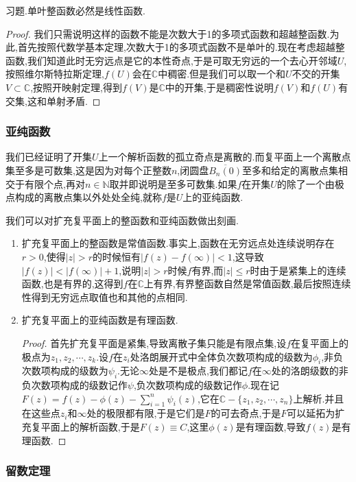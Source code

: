 习题.单叶整函数必然是线性函数.
\begin{proof}
	
	我们只需说明这样的函数不能是次数大于1的多项式函数和超越整函数.为此,首先按照代数学基本定理,次数大于1的多项式函数不是单叶的.现在考虑超越整函数,我们知道此时无穷远点是它的本性奇点,于是可取无穷远的一个去心开邻域$U$,按照维尔斯特拉斯定理,$f(U)$会在$\mathbb{C}$中稠密.但是我们可以取一个和$U$不交的开集$V\subset\mathbb{C}$,按照开映射定理,得到$f(V)$是$\mathbb{C}$中的开集,于是稠密性说明$f(V)$和$f(U)$有交集,这和单射矛盾.
\end{proof}
\subsubsection{亚纯函数}

我们已经证明了开集$U$上一个解析函数的孤立奇点是离散的.而复平面上一个离散点集至多是可数集,这是因为对每个正整数$n$,闭圆盘$\overline{B_n(0)}$至多和给定的离散点集相交于有限个点,再对$n\in\mathbb{N}$取并即说明是至多可数集.如果$f$在开集$U$的除了一个由极点构成的离散点集以外处处全纯,就称$f$是$U$上的亚纯函数.

我们可以对扩充复平面上的整函数和亚纯函数做出刻画.
\begin{enumerate}
	\item 扩充复平面上的整函数是常值函数.事实上,函数在无穷远点处连续说明存在$r>0$,使得$|z|>r$的时候恒有$|f(z)-f(\infty)|<1$,这导致$|f(z)|<|f(\infty)|+1$,说明$|z|>r$时候$f$有界,而$|z|\le r$时由于是紧集上的连续函数,也是有界的,这得到$f$在$\mathbb{C}$上有界,有界整函数自然是常值函数,最后按照连续性得到无穷远点取值也和其他的点相同.
	\item 扩充复平面上的亚纯函数是有理函数.
	\begin{proof}
		
		首先扩充复平面是紧集,导致离散子集只能是有限点集,设$f$在复平面上的极点为$z_1,z_2,\cdots,z_k$.设$f$在$z_i$处洛朗展开式中全体负次数项构成的级数为$\phi_i$,非负次数项构成的级数为$\psi_i$.无论$\infty$处是不是极点,我们都记$f$在$\infty$处的洛朗级数的非负次数项构成的级数记作$\psi$,负次数项构成的级数记作$\phi$.现在记$F(z)=f(z)-\phi(z)-\sum_{i=1}^n\psi_i(z)$,它在$\mathbb{C}-\{z_1,z_2,\cdots,z_n\}$上解析.并且在这些点$z_i$和$\infty$处的极限都有限,于是它们是$F$的可去奇点,于是$F$可以延拓为扩充复平面上的解析函数,于是$F(z)\equiv C$,这里$\phi(z)$是有理函数,导致$f(z)$是有理函数.
	\end{proof}
\end{enumerate}
\subsubsection{留数定理}

